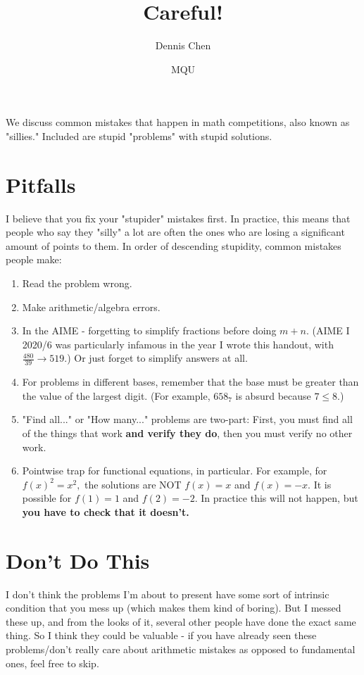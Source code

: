 \documentclass[mast]{lucky}
\title{Careful!}
\author{Dennis Chen}
\date{MQU}
\begin{document}
\maketitle
We discuss common mistakes that happen in math competitions, also known as "sillies." Included are stupid "problems" with stupid solutions.

\section{Pitfalls}
I believe that you fix your "stupider" mistakes first. In practice, this means that people who say they "silly" a lot are often the ones who are losing a significant amount of points to them. In order of descending stupidity, common mistakes people make:

\begin{enumerate}
    \item Read the problem wrong.

    \item Make arithmetic/algebra errors.
    
    \item In the AIME - forgetting to simplify fractions before doing $m+n.$ (AIME I 2020/6 was particularly infamous in the year I wrote this handout, with $\frac{480}{39}\to 519.$) Or just forget to simplify answers at all.
    
    \item For problems in different bases, remember that the base must be greater than the value of the largest digit. (For example, $658_7$ is absurd because $7\leq 8.$)
    
    \item "Find all..." or "How many..." problems are two-part: First, you must find all of the things that work \textbf{and verify they do}, then you must verify no other work.
    
    \item Pointwise trap for functional equations, in particular. For example, for $f(x)^2=x^2,$ the solutions are NOT $f(x)=x$ and $f(x)=-x.$ It is possible for $f(1)=1$ and $f(2)=-2.$ In practice this will not happen, but \textbf{you have to check that it doesn't.}
\end{enumerate}

\section{Don't Do This}
I don't think the problems I'm about to present have some sort of intrinsic condition that you mess up (which makes them kind of boring). But I messed these up, and from the looks of it, several other people have done the exact same thing. So I think they could be valuable - if you have already seen these problems/don't really care about arithmetic mistakes as opposed to fundamental ones, feel free to skip.
\end{document}
